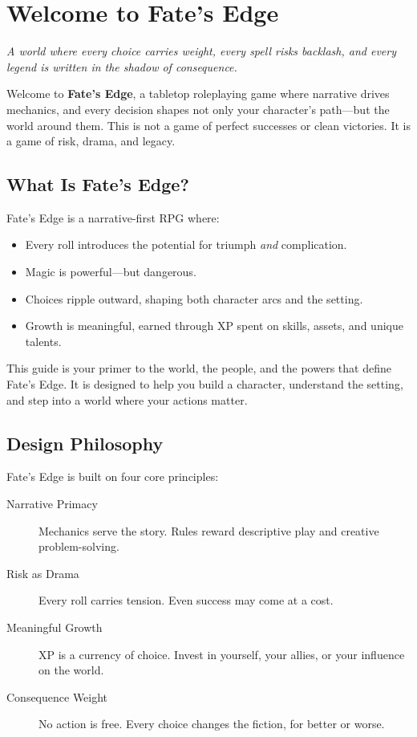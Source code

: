 
\chapter{Welcome to Fate's Edge}
\label{ch:intro}

\emph{A world where every choice carries weight, every spell risks backlash, and every legend is written in the shadow of consequence.}

Welcome to \textbf{Fate's Edge}, a tabletop roleplaying game where narrative drives mechanics, and every decision shapes not only your character's path—but the world around them. This is not a game of perfect successes or clean victories. It is a game of risk, drama, and legacy.

\section*{What Is Fate's Edge?}

Fate's Edge is a narrative-first RPG where:
\begin{itemize}
  \item Every roll introduces the potential for triumph \emph{and} complication.
  \item Magic is powerful—but dangerous.
  \item Choices ripple outward, shaping both character arcs and the setting.
  \item Growth is meaningful, earned through XP spent on skills, assets, and unique talents.
\end{itemize}

This guide is your primer to the world, the people, and the powers that define Fate's Edge. It is designed to help you build a character, understand the setting, and step into a world where your actions matter.

\section*{Design Philosophy}

Fate's Edge is built on four core principles:

\begin{description}
  \item[Narrative Primacy]  Mechanics serve the story. Rules reward descriptive play and creative problem-solving.
  \item[Risk as Drama]  Every roll carries tension. Even success may come at a cost.
  \item[Meaningful Growth]  XP is a currency of choice. Invest in yourself, your allies, or your influence on the world.
  \item[Consequence Weight]  No action is free. Every choice changes the fiction, for better or worse.
\end{description}

